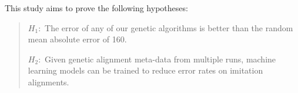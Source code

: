 This study aims to prove the following hypotheses:
	\begin{quote}
		$H_{1}:$ The error of any of our genetic algorithms is better than the random mean absolute error of 160.

		$H_{2}:$ Given genetic alignment meta-data from multiple runs, machine learning models can be trained to reduce error rates on imitation alignments.
		
	\end{quote}


